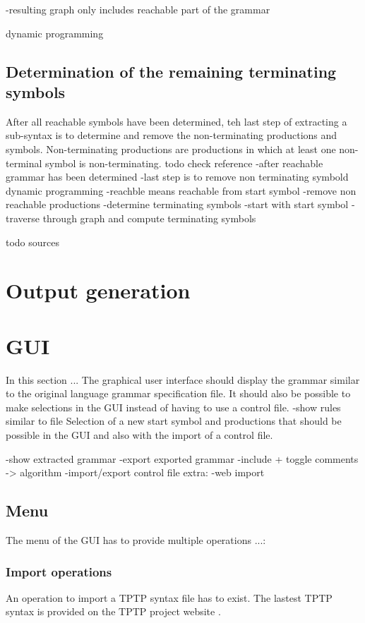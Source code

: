 -resulting graph only includes reachable part of the grammar

dynamic programming
\subsection{Determination of the remaining terminating symbols}\label{sec:ConceptDerterminingRemainingReachable}
After all reachable symbols have been determined, teh last step of extracting a sub-syntax is to determine and remove the non-terminating productions and symbols.
Non-terminating productions are productions in which at least one non-terminal symbol is non-terminating.
todo check reference
-after reachable grammar has been determined
-last step is to remove non terminating symbold
dynamic programming
-reachble means reachable from start symbol
-remove non reachable productions
-determine terminating symbols
-start with start symbol
-traverse through graph and compute terminating symbols

todo sources
\section{Output generation}\label{sec:ConceptOutputGeneration}
\section{GUI}\label{sec:ConceptGUI}
In this section ...
The graphical user interface should display the grammar similar to the original language grammar specification file.
It should also be possible to make selections in the GUI instead of having to use a control file. 
-show rules similar to file
Selection of a new start symbol and productions that should be possible in the GUI and also with the import of a control file.

-show extracted grammar
-export exported grammar
-include + toggle comments -> algorithm
-import/export control file
extra:
-web import
\subsection{Menu}\label{sec:ConceptGUIMenu}
The menu of the GUI has to provide multiple operations ...:

\subsubsection{Import operations}
An operation to import a \ac{TPTP} syntax file has to exist.
The lastest \ac{TPTP} syntax is provided on the \ac{TPTP} project website \cite{TPTP}.

